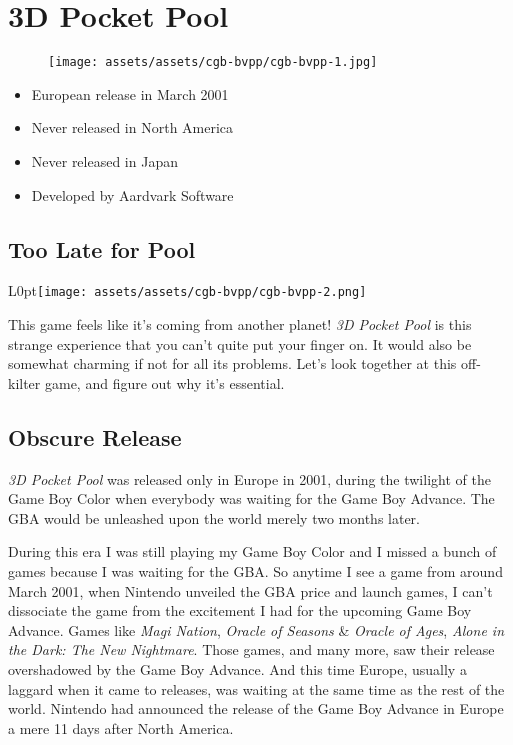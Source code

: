 \documentclass{book}
\begin{document}
\chapter*{3D Pocket Pool}
\vspace{\baselineskip}\begin{figure}[H]{\texttt{[image: assets/assets/cgb-bvpp/cgb-bvpp-1.jpg]}}\end{figure}\vspace{\baselineskip}
\begin{itemize}[left=0pt, nosep]
\item European release in March 2001
\item Never released in North America
\item Never released in Japan
\item Developed by Aardvark Software

\end{itemize}
\newpage\FloatBarrier\section*{Too Late for Pool}
\begin{wrapfigure}{L}{0pt}{\texttt{[image: assets/assets/cgb-bvpp/cgb-bvpp-2.png]}}\end{wrapfigure}\noindent
This game feels like it’s coming from another planet! \emph{3D Pocket Pool} is this strange experience that you can’t quite put your finger on. It would also be somewhat charming if not for all its problems. Let’s look together at this off-kilter game, and figure out why it’s essential.\par
\FloatBarrier\section*{Obscure Release}
\emph{3D Pocket Pool} was released only in Europe in 2001, during the twilight of the Game Boy Color when everybody was waiting for the Game Boy Advance. The GBA would be unleashed upon the world merely two months later.\par
During this era I was still playing my Game Boy Color and I missed a bunch of games because I was waiting for the GBA. So anytime I see a game from around March 2001, when Nintendo unveiled the GBA price and launch games, I can’t dissociate the game from the excitement I had for the upcoming Game Boy Advance. Games like \emph{Magi Nation}, \emph{Oracle of Seasons} \& \emph{Oracle of Ages}, \emph{Alone in the Dark: The New Nightmare}. Those games, and many more, saw their release overshadowed by the Game Boy Advance. And this time Europe, usually a laggard when it came to releases, was waiting at the same time as the rest of the world. Nintendo had announced the release of the Game Boy Advance in Europe a mere 11 days after North America.\par
\end{document}
